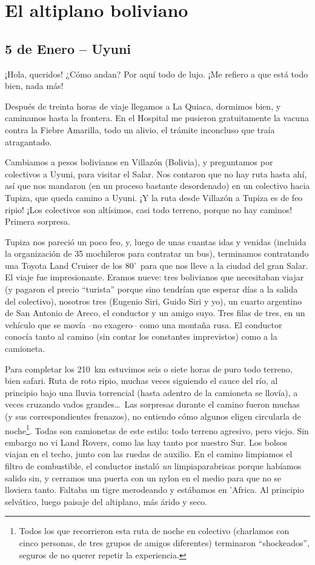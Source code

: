 \section{El altiplano boliviano}

\subsection*{5 de Enero -- Uyuni}

¡Hola, queridos! ¿Cómo andan? Por aquí todo de
lujo. ¡Me refiero a que está todo bien, nada más!

Después de treinta horas de viaje llegamos a La Quiaca, dormimos bien, y
caminamos hasta la frontera. En el Hospital me pusieron gratuitamente la vacuna
contra la Fiebre Amarilla, todo un alivio, el trámite inconcluso que traía
atragantado.

Cambiamos a pesos bolivianos en Villazón (Bolivia), y preguntamos por
colectivos a Uyuni, para visitar el Salar. Nos contaron que no hay ruta hasta
ahí, así que nos mandaron (en un proceso bastante desordenado) en un colectivo
hacia Tupiza, que queda camino a Uyuni. ¡Y la ruta desde
Villazón a Tupiza es de feo ripio! ¡Los colectivos son
altísimos, casi todo terreno, porque no hay caminos! Primera sorpresa.

Tupiza nos pareció un poco feo, y, luego de unas cuantas idas y venidas
(incluida la organización de 35 mochileros para contratar un bus), terminamos
contratando una Toyota Land Cruiser de los 80'\ para que nos lleve a la ciudad
del gran Salar. El viaje fue impresionante. Eramos nueve: tres bolivianos que
necesitaban viajar (y pagaron el precio ``turista'' porque sino tendrían que
esperar días a la salida del colectivo), nosotros tres (Eugenio Siri, Guido
Siri y yo), un cuarto argentino de San Antonio de Areco, el conductor y un amigo
suyo. Tres filas de tres, en un vehículo que se movía --no exagero-- como una
montaña rusa. El conductor conocía tanto al camino (sin contar los constantes
imprevistos) como a la camioneta.

Para completar los 210~km estuvimos seis o siete horas de puro todo terreno,
bien safari. Ruta de roto ripio, muchas veces siguiendo el cauce del río, al
principio bajo una lluvia torrencial (hasta adentro de la camioneta se llovía),
a veces cruzando vados grandes\ldots\ Las sorpresas durante el camino fueron
muchas (y sus correspondientes frenazos), no entiendo cómo algunos eligen
circularla de noche\protect\footnote{Todos los que recorrieron esta ruta de
noche en colectivo (charlamos con cinco personas, de tres grupos de amigos
diferentes) terminaron ``shockeados'', seguros de no querer repetir la
experiencia.}. Todas son camionetas de este estilo: todo terreno agresivo, pero
viejo. Sin embargo no vi Land Rovers, como las hay tanto por nuestro Sur. Los
bolsos viajan en el techo, junto con las ruedas de auxilio. En el camino
limpiamos el filtro de combustible, el conductor instaló \emph{un}
limpiaparabrisas porque habíamos salido sin, y cerramos una puerta con un nylon
en el medio para que no se lloviera tanto. Faltaba un tigre merodeando y
estábamos en 'Africa. Al principio selvático, luego paisaje del altiplano,
más árido y seco.

